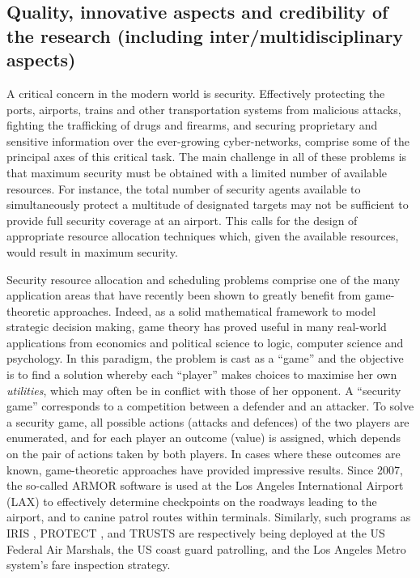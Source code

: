
\subsection{Quality, innovative aspects and credibility of the research (including inter/multidisciplinary aspects)}
\label{sec:quality}

A critical concern in the modern world is security. Effectively protecting the ports, airports, trains and other transportation systems from malicious attacks, fighting the trafficking of drugs and firearms, and securing proprietary and sensitive information over the ever-growing cyber-networks, comprise some of the principal axes of this critical task. The main challenge in all of these problems is that maximum security must be obtained with a limited number of available resources. For instance, the total number of security agents available to simultaneously protect a multitude of designated targets may not be sufficient to provide full security coverage at an airport. This calls for the design of appropriate resource allocation techniques which, given the available resources, would result in maximum security. %

Security resource allocation and scheduling problems comprise one of the many application areas that have recently been shown to greatly benefit from game-theoretic approaches. Indeed, as a solid mathematical framework to model strategic decision making, game theory has proved useful in many real-world applications from economics and political science to logic, computer science and psychology. In this paradigm, the problem is cast as a ``game'' and the objective is to find a solution whereby each ``player'' makes choices to maximise her own \textit{utilities}, which may often be in conflict with those of her opponent. A ``security game'' corresponds to a competition between a defender and an attacker. To solve a security game, all possible actions (attacks and defences) of the two players are enumerated, and for each player an outcome (value) is assigned, which depends on the pair of actions taken by both players. In cases where these outcomes are known, game-theoretic approaches have provided impressive results. Since 2007, the so-called ARMOR software \cite{pita2008deployed} is used at the Los Angeles International Airport (LAX) to effectively determine checkpoints on the roadways leading to the airport, and to canine patrol routes within terminals. Similarly, such programs as IRIS \cite{tsai2009iris}, PROTECT \cite{shieh2012protect}, and TRUSTS \cite{yin2012trusts} are respectively being deployed at the US Federal Air Marshals, the US coast guard patrolling, and the Los Angeles Metro system's fare inspection strategy. 

